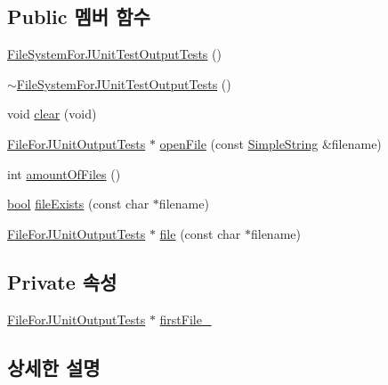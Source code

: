 \subsection*{Public 멤버 함수}
\begin{DoxyCompactItemize}
\item 
\hyperlink{class_file_system_for_j_unit_test_output_tests_a8866b25091f093ab7055fd3a5b5ee6c0}{File\+System\+For\+J\+Unit\+Test\+Output\+Tests} ()
\item 
\hyperlink{class_file_system_for_j_unit_test_output_tests_a3bd981210ae1bdb530ee6db676786f08}{$\sim$\+File\+System\+For\+J\+Unit\+Test\+Output\+Tests} ()
\item 
void \hyperlink{class_file_system_for_j_unit_test_output_tests_ae683fe63c33c388e9ba1c6392dd477eb}{clear} (void)
\item 
\hyperlink{class_file_for_j_unit_output_tests}{File\+For\+J\+Unit\+Output\+Tests} $\ast$ \hyperlink{class_file_system_for_j_unit_test_output_tests_a3741467803cff9a7f468f7f212a4604c}{open\+File} (const \hyperlink{class_simple_string}{Simple\+String} \&filename)
\item 
int \hyperlink{class_file_system_for_j_unit_test_output_tests_ad63a242920dabb020717bc70114e16a1}{amount\+Of\+Files} ()
\item 
\hyperlink{avb__gptp_8h_af6a258d8f3ee5206d682d799316314b1}{bool} \hyperlink{class_file_system_for_j_unit_test_output_tests_a6efa806ca90f2ef915c836965db6fca0}{file\+Exists} (const char $\ast$filename)
\item 
\hyperlink{class_file_for_j_unit_output_tests}{File\+For\+J\+Unit\+Output\+Tests} $\ast$ \hyperlink{class_file_system_for_j_unit_test_output_tests_a21af17866b12527f73269039f470f963}{file} (const char $\ast$filename)
\end{DoxyCompactItemize}
\subsection*{Private 속성}
\begin{DoxyCompactItemize}
\item 
\hyperlink{class_file_for_j_unit_output_tests}{File\+For\+J\+Unit\+Output\+Tests} $\ast$ \hyperlink{class_file_system_for_j_unit_test_output_tests_a1d618aef04cf9f6e25e51b7a2ee42db0}{first\+File\+\_\+}
\end{DoxyCompactItemize}


\subsection{상세한 설명}


